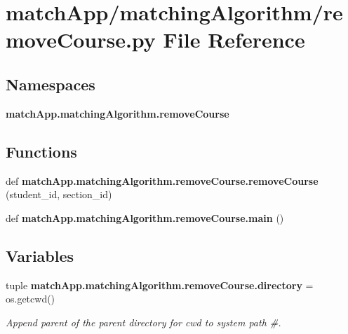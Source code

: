 \section{match\+App/matching\+Algorithm/remove\+Course.py File Reference}
\label{remove_course_8py}
\subsection*{Namespaces}
\begin{DoxyCompactItemize}
\item 
 {\bf match\+App.\+matching\+Algorithm.\+remove\+Course}
\end{DoxyCompactItemize}
\subsection*{Functions}
\begin{DoxyCompactItemize}
\item 
def {\bf match\+App.\+matching\+Algorithm.\+remove\+Course.\+remove\+Course} (student\+\_\+id, section\+\_\+id)
\item 
def {\bf match\+App.\+matching\+Algorithm.\+remove\+Course.\+main} ()
\end{DoxyCompactItemize}
\subsection*{Variables}
\begin{DoxyCompactItemize}
\item 
tuple {\bf match\+App.\+matching\+Algorithm.\+remove\+Course.\+directory} = os.\+getcwd()
\begin{DoxyCompactList}\small\item\em Append parent of the parent directory for cwd to system path \#. \end{DoxyCompactList}\end{DoxyCompactItemize}
